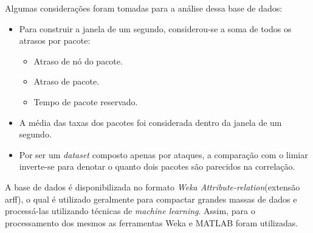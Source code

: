 Algumas considerações foram tomadas para a análise dessa base de dados:
\begin{itemize}
	\item Para construir a janela de um segundo, considerou-se a soma de todos os atrasos por pacote:
	\begin{itemize}
	 \item Atraso de nó do pacote.
	 \item  Atraso de pacote.
	 \item Tempo de pacote reservado.
	\end{itemize}
	\item A média das taxas dos pacotes foi considerada dentro da janela de um segundo.
	\item Por ser um \textit{dataset} composto apenas por ataques, a comparação com o limiar inverte-se para denotar o quanto dois pacotes são parecidos na correlação.
\end{itemize}

A base de dados é disponibilizada no formato \textit{Weka Attribute-relation}(extensão arff), o qual é utilizado geralmente para compactar grandes massas de dados e processá-las utilizando técnicas de \textit{machine learning}. Assim, para o processamento dos mesmos as ferramentas Weka e MATLAB foram utilizadas.